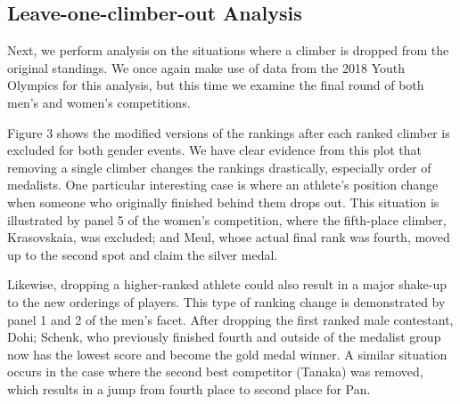 \documentclass[12pt]{article}
\begin{document}
\hypertarget{leave-one-climber-out-analysis}{%
\subsection{Leave-one-climber-out
Analysis}\label{leave-one-climber-out-analysis}}

Next, we perform analysis on the situations where a climber is dropped
from the original standings. We once again make use of data from the
2018 Youth Olympics for this analysis, but this time we examine the
final round of both men's and women's competitions.

Figure 3 shows the modified versions of the rankings after each ranked
climber is excluded for both gender events. We have clear evidence from
this plot that removing a single climber changes the rankings
drastically, especially order of medalists. One particular interesting
case is where an athlete's position change when someone who originally
finished behind them drops out. This situation is illustrated by panel 5
of the women's competition, where the fifth-place climber, Krasovskaia,
was excluded; and Meul, whose actual final rank was fourth, moved up to
the second spot and claim the silver medal.

Likewise, dropping a higher-ranked athlete could also result in a major
shake-up to the new orderings of players. This type of ranking change is
demonstrated by panel 1 and 2 of the men's facet. After dropping the
first ranked male contestant, Dohi; Schenk, who previously finished
fourth and outside of the medalist group now has the lowest score and
become the gold medal winner. A similar situation occurs in the case
where the second best competitor (Tanaka) was removed, which results in
a jump from fourth place to second place for Pan.
\end{document}
